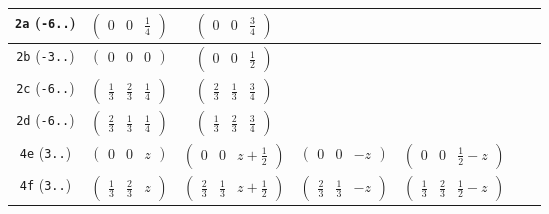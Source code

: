 \documentclass[fleqn,9pt,landscape]{jsarticle}
\begin{document}
\begin{center}
\begin{longtable}{ccccccc}
{\tt 2a} ({\tt -6..}) & $ \begin{pmatrix} 0 & 0 & \frac{1}{4} \end{pmatrix} $ & $ \begin{pmatrix} 0 & 0 & \frac{3}{4} \end{pmatrix} $ & $  $ & $  $ & $  $ & $  $ \\ \hline
{\tt 2b} ({\tt -3..}) & $ \begin{pmatrix} 0 & 0 & 0 \end{pmatrix} $ & $ \begin{pmatrix} 0 & 0 & \frac{1}{2} \end{pmatrix} $ & $  $ & $  $ & $  $ & $  $ \\ \hline
{\tt 2c} ({\tt -6..}) & $ \begin{pmatrix} \frac{1}{3} & \frac{2}{3} & \frac{1}{4} \end{pmatrix} $ & $ \begin{pmatrix} \frac{2}{3} & \frac{1}{3} & \frac{3}{4} \end{pmatrix} $ & $  $ & $  $ & $  $ & $  $ \\ \hline
{\tt 2d} ({\tt -6..}) & $ \begin{pmatrix} \frac{2}{3} & \frac{1}{3} & \frac{1}{4} \end{pmatrix} $ & $ \begin{pmatrix} \frac{1}{3} & \frac{2}{3} & \frac{3}{4} \end{pmatrix} $ & $  $ & $  $ & $  $ & $  $ \\ \hline
{\tt 4e} ({\tt 3..}) & $ \begin{pmatrix} 0 & 0 & z \end{pmatrix} $ & $ \begin{pmatrix} 0 & 0 & z + \frac{1}{2} \end{pmatrix} $ & $ \begin{pmatrix} 0 & 0 & - z \end{pmatrix} $ & $ \begin{pmatrix} 0 & 0 & \frac{1}{2} - z \end{pmatrix} $ & $  $ & $  $ \\ \hline
{\tt 4f} ({\tt 3..}) & $ \begin{pmatrix} \frac{1}{3} & \frac{2}{3} & z \end{pmatrix} $ & $ \begin{pmatrix} \frac{2}{3} & \frac{1}{3} & z + \frac{1}{2} \end{pmatrix} $ & $ \begin{pmatrix} \frac{2}{3} & \frac{1}{3} & - z \end{pmatrix} $ & $ \begin{pmatrix} \frac{1}{3} & \frac{2}{3} & \frac{1}{2} - z \end{pmatrix} $ & $  $ & $  $ \\ \hline

\end{longtable}
\end{center}
\end{document}
